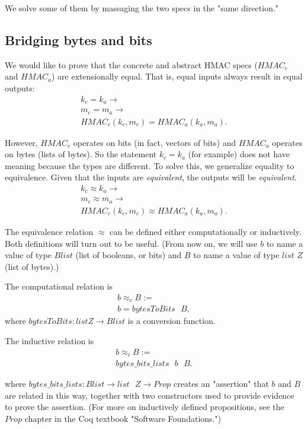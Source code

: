 \documentclass[twocolumn,showpacs,%
  nofootinbib,aps,superscriptaddress,%
  eqsecnum,prd,notitlepage,showkeys,10pt]{revtex4-1}
\begin{document}
We solve some of them by massaging the two specs in the "same direction."

\subsection{Bridging bytes and bits}

We would like to prove that the concrete and abstract HMAC specs ($HMAC_c$ and $HMAC_a$) are extensionally equal. That is, equal inputs always result in equal outputs: 
\begin{gather*}
k_c = k_a \rightarrow \\
m_c = m_a \rightarrow \\
HMAC_c(k_c, m_c) = HMAC_a(k_a, m_a).
\end{gather*}

However, $HMAC_c$ operates on bits (in fact, vectors of bits) and $HMAC_a$ operates on bytes (lists of bytes). So the statement $k_c = k_a$ (for example) does not have meaning because the types are different. To solve this, we generalize equality to equivalence. Given that the inputs are {\it equivalent}, the outputs will be {\it equivalent}.
\begin{gather*}
k_c \approx  k_a \rightarrow \\
m_c \approx m_a \rightarrow \\
HMAC_c(k_c, m_c) \approx HMAC_a(k_a, m_a).
\end{gather*}

The equivalence relation $\approx$ can be defined either computationally or inductively. Both definitions will turn out to be useful. (From now on, we will use $b$ to name a value of type $Blist$ (list of booleans, or bits) and $B$ to name a value of type $list$ $Z$ (list of bytes).)

The computational relation is 
\begin{gather*}
b \approx_c B := \\
b = bytesToBits \textrm{ } B,
\end{gather*} where $bytesToBits : list \textrm{} Z \rightarrow Blist$ is a conversion function.

The inductive relation is 
\begin{gather*}
b \approx_i B := \\
bytes\_bits\_lists \textrm{ } b \textrm{ } B.
\end{gather*}

where $bytes\_bits\_lists : Blist \rightarrow list \textrm{ } Z \rightarrow Prop$ creates an "assertion" that $b$ and $B$ are related in this way, together with two constructors used to provide evidence to prove the assertion. (For more on inductively defined propositions, see the $Prop$ chapter in the Coq textbook "Software Foundations.")
\end{document}
